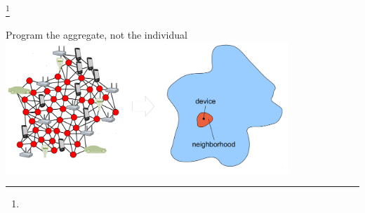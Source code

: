 \documentclass[presentation, 8pt,169]{beamer}\mode<presentation>{\usetheme{AMSBolognaFC}}
\begin{document}
\begin{frame}
\begin{center}
\Huge{\footnote{}}
\end{center}
\centering
\large{Program the aggregate, not the individual}
\\ \vspace{0.5cm}
\includegraphics[width=0.8\textwidth]{img/ac.png}
\end{frame}
\end{document}
